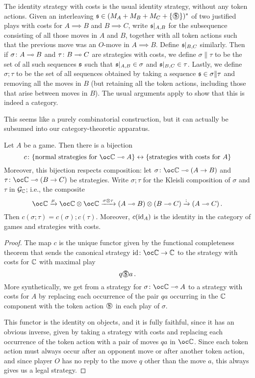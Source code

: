 \documentclass[11pt]{report}
\begin{document}
The identity strategy with costs is the usual identity strategy, without any token actions.  
Given an interleaving $\s\in(M_A+M_B+M_C+\{\slot\})^*$ of two justified plays with costs for $A \implies B$ and $B\implies C$, write $\mathfrak s\vert_{A,B}$ for the subsequence consisting of all those moves in $A$ and $B$, together with all token actions such that the previous move was an $O$-move in $A\implies B$.  
Define $\mathfrak s\vert_{B,C}$ similarly.  
Then if $\sigma\colon A \multimap B$ and $\tau\colon B \multimap C$ are strategies with costs, we define $\sigma\|\tau$ to be the set of all such sequences $\mathfrak s$ such that $\mathfrak s\vert_{A,B}\in\sigma$ and $\mathfrak s\vert_{B,C}\in\tau$.  
Lastly, we define $\sigma;\tau$ to be the set of all sequences obtained by taking a sequence $\mathfrak s\in\sigma\|\tau$ and removing all the moves in $B$ (but retaining all the token actions, including those that arise between moves in $B$).  
The usual arguments apply to show that this is indeed a category.

This seems like a purely combinatorial construction, but it can actually be subsumed into our category-theoretic apparatus.

\begin{proposition}
  Let $A$ be a game.  
  Then there is a bijection
  \[
    c \from \{\text{normal strategies for $\oc\bC \implies A$}\}\leftrightarrow\{\text{strategies with costs for $A$}\}
    \]
  Moreover, this bijection respects composition: let $\sigma \from\oc\bC \implies (A \to B)$ and $\tau \from \oc\bC \implies (B \to C)$ be strategies.  
  Write $\sigma;\tau$ for the Kleisli composition of $\sigma$ and $\tau$ in $\mathcal G_{\mathbb{C}}$; i.e., the composite
  \[
    \oc\bC \xrightarrow{\mu}
    \oc\bC \tensor \oc\bC \xrightarrow{\sigma\tensor\tau}
    (A \implies B) \tensor (B \implies C) \xrightarrow{;}
    (A \implies C)\,.
    \]
  Then $c(\sigma;\tau)=c(\sigma);c(\tau)$.  
  Moreover, $c(\operatorname{id}_A)$ is the identity in the category of games and strategies with costs.
\end{proposition}
\begin{proof}
  The map $c$ is the unique functor given by the functional completeness theorem that sends the canonical strategy $\id \from \oc\bC \to \bC$ to the strategy with costs for $\mathbb{C}$ with maximal play
  \[
    q\slot a\,.
    \]
  More synthetically, we get from a strategy for $\sigma\from\oc \bC \implies A$ to a strategy with costs for $A$ by replacing each occurrence of the pair $qa$ occurring in the $\mathbb{C}$ component with the token action $\slot$ in each play of $\sigma$.

  This functor is the identity on objects, and it is fully faithful, since it has an obvious inverse, given by taking a strategy with costs and replacing each occurrence of the token action with a pair of moves $qa$ in $\oc\bC$.
  Since each token action must always occur after an opponent move or after another token action, and since player $O$ has no reply to the move $q$ other than the move $a$, this always gives us a legal strategy.
\end{proof}
\end{document}
